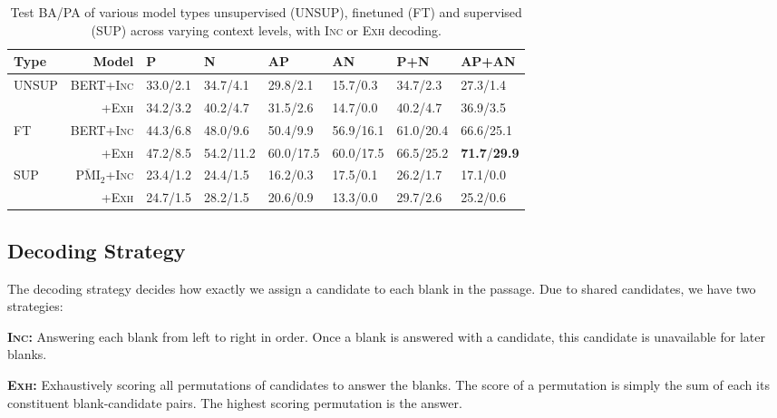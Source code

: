 \documentclass[11pt,a4paper]{article}
\newenvironment{tight_enumerate}{
\begin{enumerate}
  \setlength{\itemsep}{0pt}
  \setlength{\parskip}{0pt}
}{\end{enumerate}}
\begin{document}
\begin{table*}
\centering
\begin{tabular}{l r l l l l l l}
\toprule
\bf Type & \bf Model &  \textsc{P}  &  \textsc{N} & \textsc{AP}  & \textsc{AN} & \textsc{P+N}   & \textsc{AP+AN}   \\ 
\midrule
\multirow{2}{*}{\textsc{UNSUP}} 
& \textsc{BERT+\textsc{Inc}} & 33.0/2.1 & 34.7/4.1 & 29.8/2.1  & 15.7/0.3  & 34.7/2.3 & 27.3/1.4  \\
& \textsc{+\textsc{Exh}} & 34.2/3.2 & 40.2/4.7 & 31.5/2.6  & 14.7/0.0 & 40.2/4.7 & 36.9/3.5   \\
\midrule
\multirow{2}{*}{\textsc{FT}} & \textsc{BERT+\textsc{Inc}} & 44.3/6.8 & 48.0/9.6 & 50.4/9.9 & 56.9/16.1 & 61.0/20.4 & 66.6/25.1 \\
& \textsc{+\textsc{Exh}} & 47.2/8.5 & 54.2/11.2 & 60.0/17.5 & 60.0/17.5 & 66.5/25.2 & \textbf{71.7}/\textbf{29.9}\\
 \midrule
  \multirow{2}{*}{\textsc{SUP}}
& \textsc{$\overline{\textrm{PMI}}_{2}$+\textsc{Inc}} & 23.4/1.2  & 24.4/1.5 & 16.2/0.3 &  17.5/0.1 & 26.2/1.7 & 17.1/0.0   \\
& \textsc{+\textsc{Exh}} & 24.7/1.5  & 28.2/1.5 & 20.6/0.9 &  13.3/0.0 & 29.7/2.6 & 25.2/0.6  \\
\bottomrule
\end{tabular}
\caption{Test \textsc{BA}/\textsc{PA} of various model types unsupervised (\textsc{UNSUP}), finetuned (\textsc{FT}) and supervised (\textsc{SUP}) across varying context levels, with \textsc{Inc} or \textsc{Exh} decoding.}
\label{tab:mainres}
\end{table*}



\subsection{Decoding Strategy}
The decoding strategy decides how exactly we assign a candidate to each blank in the passage. Due to shared candidates, we have two strategies:
\begin{tight_enumerate}
  \setlength{\parskip}{0pt}
  \setlength{\itemsep}{0pt plus 1pt}
    \item \textsc{\textbf{Inc:}}  Answering each blank from left to right in order. Once a blank is answered with a candidate, this candidate is unavailable for later blanks. 
    \item \textsc{\textbf{Exh:}} Exhaustively scoring all permutations of candidates to answer the blanks. The score of a permutation is simply the sum of each its constituent blank-candidate pairs. The highest scoring permutation is the answer.
\end{tight_enumerate}
\end{document}
